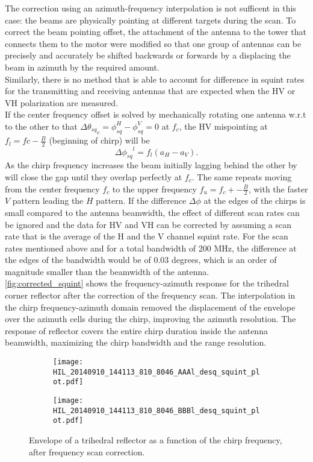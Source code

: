The correction using an azimuth-frequency interpolation is not sufficent in this case: the beams are physically pointing at different targets during the scan. To correct the beam pointing offset, the attachment of the antenna to the tower that connects them to the motor were modified so that one group of antennas can be precisely and accurately be shifted backwards or forwards by a displacing the beam in azimuth by the required amount.\\ Similarly, there is no method that is able to account for difference in squint rates for the transmitting and receiving antennas that are expected when the HV or VH polarization are measured.\\ If the center frequency offset is solved by mechanically rotating one antenna w.r.t to the other to that ${\Delta\theta_{sq}}_{c}=\phi_{sq}^{H} - \phi_{sq}^{V} =0$ at $f_{c}$, the HV mispointing  at $f_{l} = fc - \frac{B}{2}$ (beginning of chirp) will be 
\begin{equation}
	{\Delta\phi_{sq}}^{l} = f_{l} \left(a_{H} - a_{V} \right).
\end{equation} 
As the chirp frequency increases the beam initially lagging behind the other by  will close the gap until they overlap perfectly at $f_{c}$. The same repeats moving from the center frequency $f_{c}$ to the upper frequency $f_{u} = f_{c} + - \frac{B}{2}$, with the faster $V$ pattern leading the $H$ pattern. If the difference $\Delta\phi$ at the edges of the chirps is small compared to the antenna beamwidth, the effect of different scan rates can be ignored and the data for HV and VH can be corrected by assuming a scan rate that is the average of the H and the V channel squint rate. For the scan rates mentioned above and for a total bandwidth of 200 MHz, the difference at the edges of the bandwidth would be of 0.03 degrees, which is an order of magnitude smaller than the beamwidth of the antenna.\\
\autoref{fig:corrected_squint} shows the frequency-azimuth response for the trihedral corner reflector after the correction of the frequency scan. The interpolation in the chirp frequency-azimuth domain removed the displacement of the envelope over the azimuth cells during the chirp, improving the azimuth resolution. The response of reflector covers the entire chirp duration inside the antenna beamwidth, maximizing the chirp bandwidth and the range resolution.\\
\begin{figure}[h]
	\begin{subfigure}[b]{\columnwidth}
		\centering
		\texttt{[image: HIL\_20140910\_144113\_810\_8046\_AAAl\_desq\_squint\_plot.pdf]}
	\end{subfigure}
	\begin{subfigure}[b]{\columnwidth}
		\centering
		\texttt{[image: HIL\_20140910\_144113\_810\_8046\_BBBl\_desq\_squint\_plot.pdf]}
	\end{subfigure}
	\caption{Envelope of a trihedral reflector as a function of the chirp frequency, after frequency scan correction.}
	\label{fig:corrected_squint}
\end{figure}
\FloatBarrier
